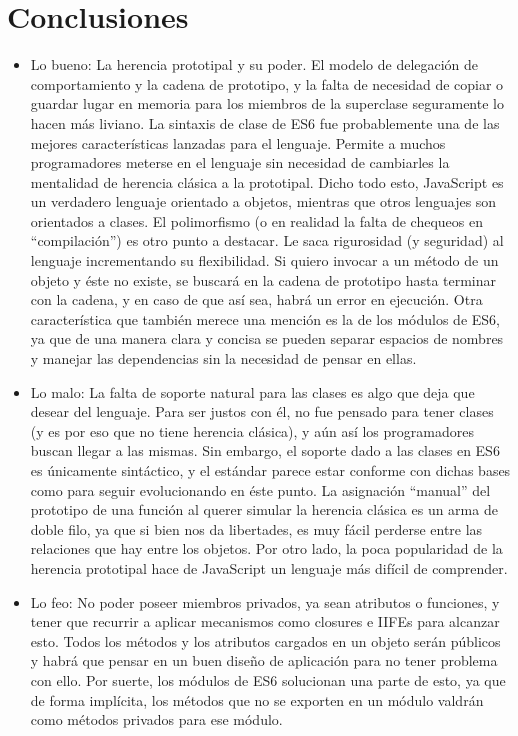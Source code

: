 \section{Conclusiones}

\begin{itemize}
\item Lo bueno: 
La herencia prototipal y su poder. El modelo de delegación de comportamiento y la cadena de prototipo, y la falta de necesidad de copiar o guardar lugar en memoria para los miembros de la superclase seguramente lo hacen más liviano. 
La sintaxis de clase de ES6 fue probablemente una de las mejores características lanzadas para el lenguaje. Permite a muchos programadores meterse en el lenguaje sin necesidad de cambiarles la mentalidad de herencia clásica a la prototipal.
Dicho todo esto, JavaScript es un verdadero lenguaje orientado a objetos, mientras que otros lenguajes son orientados a clases.
El polimorfismo (o en realidad la falta de chequeos en "`compilación"') es otro punto a destacar. Le saca rigurosidad (y seguridad) al lenguaje incrementando su flexibilidad. Si quiero invocar a un método de un objeto y éste no existe, se buscará en la cadena de prototipo hasta terminar con la cadena, y en caso de que así sea, habrá un error en ejecución.
Otra característica que también merece una mención es la de los módulos de ES6, ya que de una manera clara y concisa se pueden separar espacios de nombres y manejar las dependencias sin la necesidad de pensar en ellas.
\item Lo malo: 
La falta de soporte natural para las clases es algo que deja que desear del lenguaje. Para ser justos con él, no fue pensado para tener clases (y es por eso que no tiene herencia clásica), y aún así los programadores buscan llegar a las mismas. Sin embargo, el soporte dado a las clases en ES6 es únicamente sintáctico, y el estándar parece estar conforme con dichas bases como para seguir evolucionando en éste punto. 
La asignación "`manual"' del prototipo de una función al querer simular la herencia clásica es un arma de doble filo, ya que si bien nos da libertades, es muy fácil perderse entre las relaciones que hay entre los objetos. Por otro lado, la poca popularidad de la herencia prototipal hace de JavaScript un lenguaje más difícil de comprender.
\item Lo feo: 
No poder poseer miembros privados, ya sean atributos o funciones, y tener que recurrir a aplicar mecanismos como closures e IIFEs para alcanzar esto. Todos los métodos y los atributos cargados en un objeto serán públicos y habrá que pensar en un buen diseño de aplicación para no tener problema con ello. Por suerte, los módulos de ES6 solucionan una parte de esto, ya que de forma implícita, los métodos que no se exporten en un módulo valdrán como métodos privados para ese módulo.
\end{itemize}